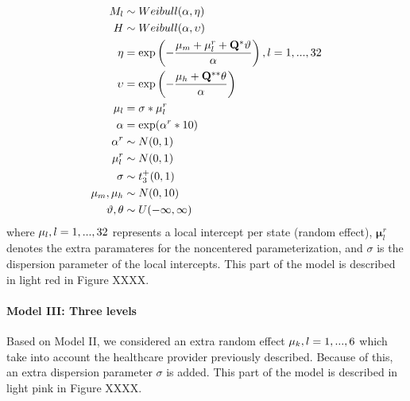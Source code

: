 \documentclass[10pt,letterpaper]{article}
\begin{document}
\[
\begin{aligned}
 M_l   &\sim Weibull(\alpha,\mathbf{\eta})\\
 H  &\sim Weibull(\alpha,\mathbf{\upsilon}) \\
 \mathbf{\eta} &= \exp\left(-\frac{\mu_m+\mathbf{\mu}_l^r+\mathbf{Q}^*\mathbf{\vartheta}}{\alpha}\right),\space\space l=1,...,32\\
 \mathbf{\upsilon} &= \exp\left(-\frac{\mu_h+\mathbf{Q}^{**}\mathbf{\theta}}{\alpha}\right) \\
 \mathbf{\mu}_l&=\sigma*\mathbf{\mu}_l^r \\
 \alpha&=\exp(\alpha^r*10) \\
 \alpha^r&\sim N(0,1) \\
 \mu^r_l&\sim N(0,1) \\
 \sigma&\sim t^+_3(0,1) \\
 \mu_m,\mu_h &\sim N(0,10) \\
 \mathbf{\vartheta},\mathbf{\theta} &\sim U(-\infty,\infty) \\
\end{aligned}
\] where \(\mathbf{\mu}_l, \space l=1,...,32\) represents a local
intercept per state (random effect), \(\mathbf{\mu}^r_l\) denotes the
extra paramateres for the noncentered parameterization, and \(\sigma\)
is the dispersion parameter of the local intercepts. This part of the
model is described in light red in Figure XXXX.

\hypertarget{model-iii-three-levels}{%
\paragraph{Model III: Three levels}\label{model-iii-three-levels}}

Based on Model II, we considered an extra random effect
\(\mathbf{\mu}_k, \space l=1,...,6\) which take into account the
healthcare provider previously described. Because of this, an extra
dispersion parameter \(\sigma\) is added. This part of the model is
described in light pink in Figure XXXX.
\end{document}
